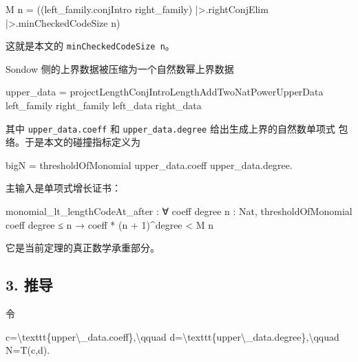 \documentclass[
  a4paper,
  12pt]{ctexart}
\newenvironment{Shaded}{}{}
\newcommand{\NormalTok}[1]{#1}
\begin{document}
\begin{Shaded}
\begin{Highlighting}[]
\NormalTok{M n =}
\NormalTok{  ((left\_family.conjIntro right\_family)}
\NormalTok{    |\textgreater{}.rightConjElim}
\NormalTok{    |\textgreater{}.minCheckedCodeSize n)}
\end{Highlighting}
\end{Shaded}

这就是本文的 \texttt{minCheckedCodeSize\ n}。

Sondow 侧的上界数据被压缩为一个自然数幂上界数据

\begin{Shaded}
\begin{Highlighting}[]
\NormalTok{upper\_data =}
\NormalTok{  projectLengthConjIntroLengthAddTwoNatPowerUpperData}
\NormalTok{    left\_family right\_family left\_data right\_data}
\end{Highlighting}
\end{Shaded}

其中 \texttt{upper\_data.coeff} 和 \texttt{upper\_data.degree}
给出生成上界的自然数单项式 包络。于是本文的碰撞指标定义为

\begin{Shaded}
\begin{Highlighting}[]
\NormalTok{bigN =}
\NormalTok{  thresholdOfMonomial upper\_data.coeff upper\_data.degree.}
\end{Highlighting}
\end{Shaded}

主输入是单项式增长证书：

\begin{Shaded}
\begin{Highlighting}[]
\NormalTok{monomial\_lt\_lengthCodeAt\_after :}
\NormalTok{  ∀ coeff degree n : Nat,}
\NormalTok{    thresholdOfMonomial coeff degree ≤ n →}
\NormalTok{      coeff * (n + 1)\^{}degree \textless{} M n}
\end{Highlighting}
\end{Shaded}

它是当前定理的真正数学承重部分。

\subsection{3. 推导}\label{ux63a8ux5bfc}

令

\begin{Shaded}
\begin{Highlighting}[]
\NormalTok{c=\textbackslash{}texttt\{upper\textbackslash{}\_data.coeff\},\textbackslash{}qquad}
\NormalTok{d=\textbackslash{}texttt\{upper\textbackslash{}\_data.degree\},\textbackslash{}qquad}
\NormalTok{N=T(c,d).}
\end{Highlighting}
\end{Shaded}
\end{document}
